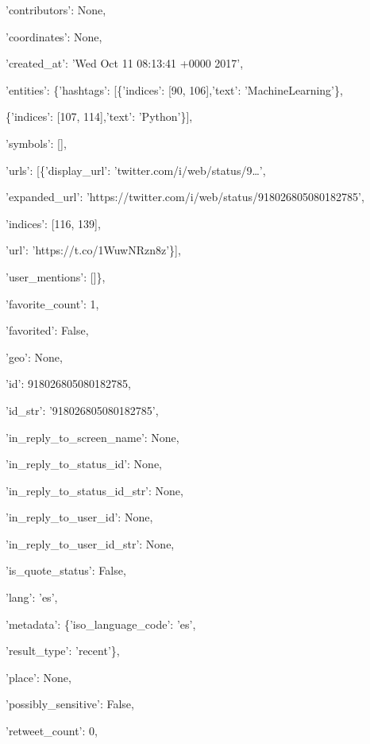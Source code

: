 \quad'contributors': None,

\quad'coordinates': None,

\quad'created\_at': 'Wed Oct 11 08:13:41 +0000 2017',

\quad'entities': \{'hashtags': [\{'indices': [90, 106],'text': 'MachineLearning'\},

				  \hspace{4cm}\{'indices': [107, 114],'text': 'Python'\}],

	\hspace{2cm} 'symbols': [],

	\hspace{2cm}'urls': [\{'display\_url': 'twitter.com/i/web/status/9…',

				\hspace{3cm}'expanded\_url': 'https://twitter.com/i/web/status/918026805080182785',

				\hspace{3cm}'indices': [116, 139],

				\hspace{3cm}'url': 'https://t.co/1WuwNRzn8z'\}],

	\hspace{2cm}'user\_mentions': []\},

\quad'favorite\_count': 1,

\quad'favorited': False,

\quad'geo': None,

\quad'id': 918026805080182785,

\quad'id\_str': '918026805080182785',

\quad'in\_reply\_to\_screen\_name': None,

\quad'in\_reply\_to\_status\_id': None,

\quad'in\_reply\_to\_status\_id\_str': None,

\quad'in\_reply\_to\_user\_id': None,

\quad'in\_reply\_to\_user\_id\_str': None,

\quad'is\_quote\_status': False,

\quad'lang': 'es',

\quad'metadata': \{'iso\_language\_code': 'es',

	 \hspace{2.3cm}'result\_type': 'recent'\},

\quad'place': None,

\quad'possibly\_sensitive': False,

\quad'retweet\_count': 0,

